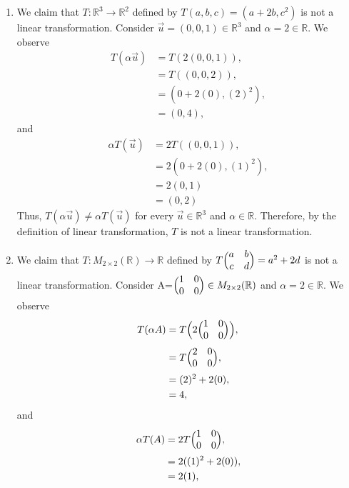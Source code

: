 \documentclass[12pt,answers]{exam}
\newcommand{\R}{\mathbb{R}}
\begin{document}
\begin{solution}
\begin{enumerate}[label=\roman*)]
\item We claim that $T:\R^{3}\rightarrow \R^{2}$ defined by $T(a,b,c)=(a+2b,c^{2})$ is not a linear transformation. Consider $\vec{u}=(0,0,1)\in \R^{3}$ and $\alpha=2\in\R$. We observe
\begin{align*}
	T(\alpha \vec{u})&=T(2(0,0,1)), \\
	&=T((0,0,2)), \\
	&=(0+2(0),(2)^2), \\
	&=(0,4),
\end{align*} and
\begin{align*} 
	\alpha T(\vec{u})&=2T((0,0,1)), \\
	&=2(0+2(0),(1)^2), \\
	&=2(0,1) \\
	&=(0,2)
\end{align*}
Thus, $T(\alpha \vec{u})\neq\alpha T(\vec{u})$ for every $\vec{u} \in \R^{3}$ and $\alpha \in\R$. Therefore, by the definition of linear transformation, $T$ is not a linear transformation.
\item We claim that $T:M_{2\times 2}(\R)\rightarrow \R$ defined by $T\Bigl( \begin{matrix}a & b\\ c & d\end{matrix}\Bigr)=a^{2}+2d$ is not a linear transformation. Consider A=$\Bigl( \begin{matrix}1 & 0\\ 0 & 0\end{matrix}\Bigr)\in M_{2\times 2}(\R)$ and $\alpha=2\in\R$. We observe
\begin{align*}
	T(\alpha A)&=T\Bigl(2\Bigl( \begin{matrix}1 & 0\\ 0 & 0\end{matrix}\Bigr)\Bigr), \\
	&=T\Bigl( \begin{matrix}2 & 0\\ 0 & 0\end{matrix}\Bigr), \\
	&=(2)^2+2(0), \\
	&=4,
\end{align*} and
\begin{align*}
	\alpha T(A)&=2T\Bigl( \begin{matrix}1 & 0\\ 0 & 0\end{matrix}\Bigr), \\
	&=2((1)^2+2(0)), \\
	&=2(1), \\

\end{align*}
\end{enumerate}
\end{solution}
\end{document}
